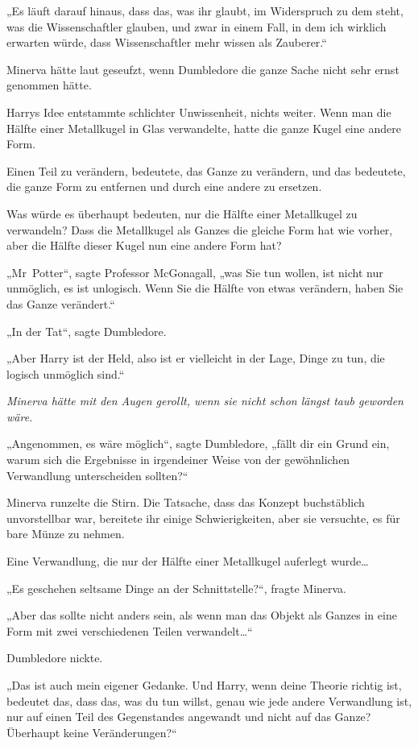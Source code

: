 {„Es läuft darauf hinaus, dass das, was ihr glaubt, im Widerspruch zu dem steht, was die Wissenschaftler glauben, und zwar in einem Fall, in dem ich wirklich erwarten würde, dass Wissenschaftler mehr wissen als Zauberer.“

Minerva hätte laut geseufzt, wenn Dumbledore die ganze Sache nicht sehr ernst genommen hätte.

Harrys Idee entstammte schlichter Unwissenheit, nichts weiter. Wenn man die Hälfte einer Metallkugel in Glas verwandelte, hatte die ganze Kugel eine andere Form.

Einen Teil zu verändern, bedeutete, das Ganze zu verändern, und das bedeutete, die ganze Form zu entfernen und durch eine andere zu ersetzen.

Was würde es überhaupt bedeuten, nur die Hälfte einer Metallkugel zu verwandeln? Dass die Metallkugel als Ganzes die gleiche Form hat wie vorher, aber die Hälfte dieser Kugel nun eine andere Form hat?

„Mr~Potter“, sagte Professor McGonagall, „was Sie tun wollen, ist nicht nur unmöglich, es ist unlogisch. Wenn Sie die Hälfte von etwas verändern, haben Sie das Ganze verändert.“

„In der Tat“, sagte Dumbledore.

„Aber Harry ist der Held, also ist er vielleicht in der Lage, Dinge zu tun, die logisch unmöglich sind.“

\emph{Minerva hätte mit den Augen gerollt, wenn sie nicht schon längst taub geworden wäre.}

„Angenommen, es wäre möglich“, sagte Dumbledore, „fällt dir ein Grund ein, warum sich die Ergebnisse in irgendeiner Weise von der gewöhnlichen Verwandlung unterscheiden sollten?“

Minerva runzelte die Stirn. Die Tatsache, dass das Konzept buchstäblich unvorstellbar war, bereitete ihr einige Schwierigkeiten, aber sie versuchte, es für bare Münze zu nehmen.

Eine Verwandlung, die nur der Hälfte einer Metallkugel auferlegt wurde…

„Es geschehen seltsame Dinge an der Schnittstelle?“, fragte Minerva.

„Aber das sollte nicht anders sein, als wenn man das Objekt als Ganzes in eine Form mit zwei verschiedenen Teilen verwandelt…“

Dumbledore nickte.

„Das ist auch mein eigener Gedanke. Und Harry, wenn deine Theorie richtig ist, bedeutet das, dass das, was du tun willst, genau wie jede andere Verwandlung ist, nur auf einen Teil des Gegenstandes angewandt und nicht auf das Ganze? Überhaupt keine Veränderungen?“

}
